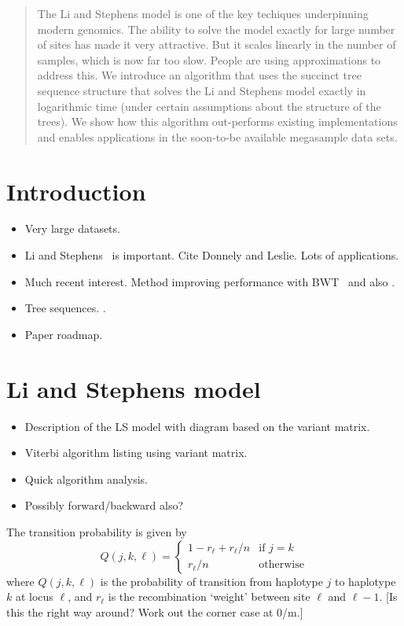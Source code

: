 \documentclass{article}
\begin{document}
\begin{abstract}
The Li and Stephens model is one of the key techiques underpinning modern
genomics. The ability to solve the model exactly for large number of
sites has made it very attractive. But it scales linearly in the number
of samples, which is now far too slow. People are using approximations
to address this. We introduce an algorithm that uses the succinct
tree sequence structure that solves the Li and Stephens model exactly
in logarithmic time (under certain assumptions about the structure
of the trees). We show how this algorithm out-performs existing implementations
and enables applications in the soon-to-be available megasample data sets.

\end{abstract}


\section{Introduction}

\begin{itemize}
\item Very large datasets.
\item Li and Stephens~\citep{li2003modeling,donnelly2010coalescent} is important. Cite Donnely and
Leslie. Lots of applications.
\item Much recent interest. Method improving performance with BWT~\citep{lunter2018haplotype}
and also \citep{rosen2018average}.
\item Tree sequences.
\citep{kelleher2016efficient,kelleher2018efficient,kelleher2018inferring,haller2018tree}.
\item Paper roadmap.
\end{itemize}

\section{Li and Stephens model}

\begin{itemize}
\item Description of the LS model with diagram based on the variant matrix.
\item Viterbi algorithm listing using variant matrix.
\item Quick algorithm analysis.
\item Possibly forward/backward also?
\end{itemize}

The transition probability is given by
\[
Q(j, k, \ell) = \begin{cases}
1 - r_\ell + r_\ell / n & \text{if $j = k$} \\
r_\ell / n & \text{otherwise}
\end{cases}
\]
where $Q(j, k, \ell)$ is the probability of transition from haplotype $j$
to haplotype $k$ at locus $\ell$, and $r_\ell$ is the recombination `weight'
between site $\ell$ and $\ell - 1$. [Is this the right way around? Work out
the corner case at 0/m.]
\end{document}
